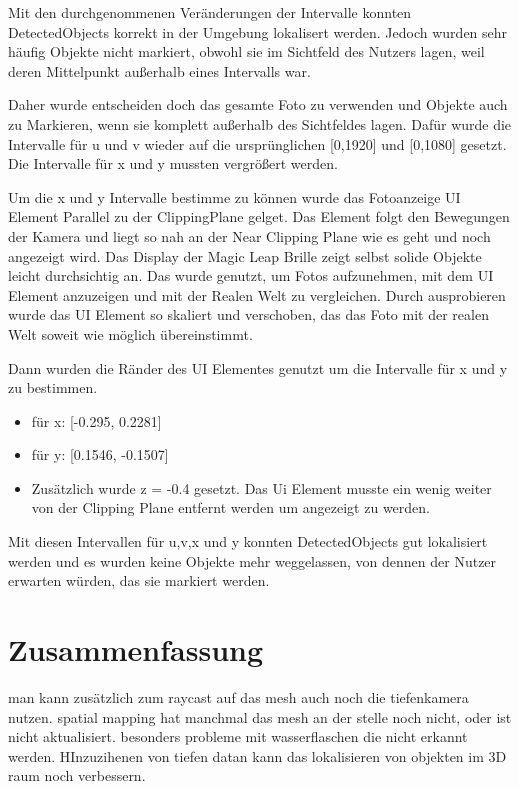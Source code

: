 \documentclass[german,a4paper, 12pt]{llncs}
\begin{document}
Mit den durchgenommenen Veränderungen der Intervalle konnten DetectedObjects korrekt in der Umgebung lokalisert werden. Jedoch wurden sehr häufig Objekte nicht markiert, obwohl sie im Sichtfeld des Nutzers lagen, weil deren Mittelpunkt außerhalb eines Intervalls war.

Daher wurde entscheiden doch das gesamte Foto zu verwenden und Objekte auch zu Markieren, wenn sie komplett außerhalb des Sichtfeldes lagen. 
Dafür wurde die Intervalle für u und v wieder auf die ursprünglichen [0,1920] und [0,1080] gesetzt. Die Intervalle für x und y mussten vergrößert werden.

Um die x und y Intervalle bestimme zu können wurde das Fotoanzeige UI Element Parallel zu der ClippingPlane gelget. Das Element folgt den Bewegungen der Kamera und liegt so nah an der Near Clipping Plane wie es geht und noch angezeigt wird. Das Display der Magic Leap Brille zeigt selbst solide Objekte leicht durchsichtig an. Das wurde genutzt, um Fotos aufzunehmen, mit dem UI Element anzuzeigen und mit der Realen Welt zu vergleichen. Durch ausprobieren wurde das UI Element so skaliert und verschoben, das das Foto mit der realen Welt soweit wie möglich übereinstimmt.

Dann wurden die Ränder des UI Elementes genutzt um die Intervalle für x und y zu bestimmen.
\begin{itemize}
	\item für x: [-0.295, 0.2281]
	\item für y: [0.1546, -0.1507]
	\item Zusätzlich wurde z = -0.4 gesetzt. Das Ui Element musste ein wenig weiter von der Clipping Plane entfernt werden um angezeigt zu werden.
\end{itemize}

Mit diesen Intervallen für u,v,x und y konnten DetectedObjects gut lokalisiert werden und es wurden keine Objekte mehr weggelassen, von dennen der Nutzer erwarten würden, das sie markiert werden.



\section{Zusammenfassung}
man kann zusätzlich zum raycast auf das mesh auch noch die tiefenkamera nutzen. spatial mapping hat manchmal das mesh an der stelle noch nicht, oder ist nicht aktualisiert. besonders probleme mit wasserflaschen die nicht erkannt werden. HInzuzihenen von tiefen datan kann das lokalisieren von objekten im 3D raum noch verbessern.
	
	\newpage
	\printbibliography
\end{document}
